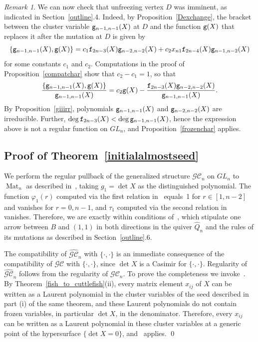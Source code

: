 \documentclass{amsart}
\theoremstyle{definition}
\theoremstyle{remark}
\newtheorem{remark}[theorem]{Remark}
\numberwithin{equation}{section}
\numberwithin{theorem}{section}
\def\CC{{\mathcal C}}
\def\G{{\mathcal G}}
\def\GCC{{\G\CC}}
\def\ef{{\tt f}}
\def\eg{{\tt g}}
\def\fy{\varphi}
\def\Mat{\operatorname{Mat}}
\def\Poi{{\{{\cdot},{\cdot}\}}}
\def\deg{{\operatorname{deg}}}
\begin{document}
\begin{remark}\label{whyunfreeze}
We can now check that unfreezing vertex $D$ was imminent, as indicated in Section~\ref{outline}.4. Indeed, by
Proposition~\ref{Dexchange}, the bracket between the cluster variable $\eg_{n-1,n-1}(X)$ at $D$ and the function $\eg(X)$ that replaces it after the mutation at $D$ is given by
\[
\{\eg_{n-1,n-1}(X),\eg(X)\}=c_1\ef_{2n-3}(X)\eg_{n-2,n-2}(X)+c_2x_{n1}\ef_{2n-4}(X)\eg_{n-1,n-2}(X)
\]
for some constants $c_1$ and $c_2$. Computations in the proof of Proposition~\ref{compatchar} show that $c_2-c_1=1$, so that
\[
\frac{\{\eg_{n-1,n-1}(X),\eg(X)\}}{\eg_{n-1,n-1}(X)}=c_2\eg(X)-\frac{\ef_{2n-3}(X)\eg_{n-2,n-2}(X)}{\eg_{n-1,n-1}(X)}.
\]
By Proposition~\ref{giiirr}, polynomials $\eg_{n-1,n-1}(X)$ and $\eg_{n-2,n-2}(X)$ are irreducible. Further,  $\deg\,\ef_{2n-3}(X)<
\deg\,\eg_{n-1,n-1}(X)$, hence  the expression above is not a regular function on 
$GL_n$, and Proposition~\ref{frozenchar} applies.
\end{remark}
 
\subsection{Proof of Theorem~\ref{initialalmostseed}}
We perform the regular pullback of the generalized structure $\G\CC_n$ on $GL_n$ to $\Mat_n$ as 
described in~\cite{GSVpullback}, taking $g_1=\det X$ as the distinguished polynomial.
The function $\fy_1(r)$ computed via the first relation in~\cite[Eq.~(4.5)]{GSVpullback} equals~1 for $r\in[1,n-2]$ 
and vanishes for $r=0, n-1$, and 
$\tau_1$ computed via the second relation in~\cite[Eq.~(4.5)]{GSVpullback} vanishes. Therefore, we are exactly within
conditions of~\cite[Remark 4.6]{GSVpullback}, which stipulate one arrow between $B$ and $(1,1)$ in both directions in the 
quiver $\widehat Q_n$ and the rules of its mutations as described in Section~\ref{outline}.6.

The compatibility of $\widehat\GCC_n$ with $\Poi$ is an immediate consequence of the compatibility of $\G\CC$ with $\Poi$, since $\det X$ is a Casimir for $\Poi$. Regularity of  $\widehat\GCC_n$ follows from the regularity of $\G\CC_n$. To prove the completeness we invoke~\cite[Theorem 6.2]{GSVpullback}. By Theorem~\ref{fish_to_cuttlefish}(ii), every matrix element 
$x_{ij}$ of $X$ can be written as a Laurent polynomial in the cluster variables of the seed described in part (i) of the same theorem, and these Laurent polynomials do not contain frozen variables, in particular $\det X$, in the denominator.
Therefore,  every $x_{ij}$ can be written as a Laurent polynomial in these cluster variables at a generic point of the
hypersurface $\{\det X=0\}$, and~\cite[Theorem 6.2]{GSVpullback} applies. \qed
\end{document}
